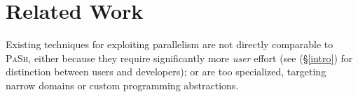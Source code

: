 \documentclass[sigplan, review, screen, anonymous]{acmart}
\newcommand{\heading}[1]{\vspace{4pt}\noindent\textbf{#1}\enspace}
\newcommand{\ttt}[1]{\texttt{#1}}
\newcommand{\kk}[1]{[{\color{magenta}kk: #1}]}
\newcommand{\sx}[1]{(\S\ref{#1})}
\newcommand{\sys}{{\scshape PaSh}\xspace}
\begin{document}
  

\section{Related Work}
\label{related}

Existing techniques for exploiting parallelism are not directly comparable to \sys, either because they require significantly more \emph{user} effort (see \sx{intro} for distinction between users and developers); or are too specialized, targeting narrow domains or custom programming abstractions.
\end{document}
